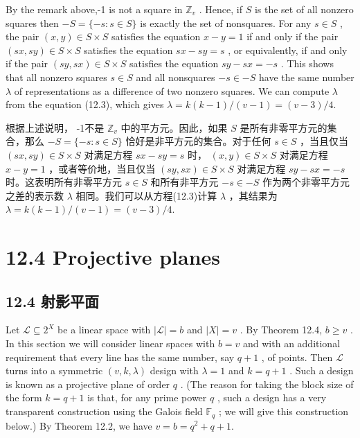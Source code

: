 \documentclass[10pt]{article}
\begin{document}
By the remark above,-1 is not a square in \({\mathbb{Z}}_{v}\) . Hence, if \(S\) is the set of all nonzero squares then \(- S = \{  - s : s \in  S\}\) is exactly the set of nonsquares. For any \(s \in  S\) , the pair \(\left( {x,y}\right)  \in  S \times  S\) satisfies the equation \(x - y = 1\) if and only if the pair \(\left( {{sx},{sy}}\right)  \in  S \times  S\) satisfies the equation \({sx} - {sy} = s\) , or equivalently, if and only if the pair \(\left( {{sy},{sx}}\right)  \in  S \times  S\) satisfies the equation \({sy} - {sx} =  - s\) . This shows that all nonzero squares \(s \in  S\) and all nonsquares \(- s \in   - S\) have the same number \(\lambda\) of representations as a difference of two nonzero squares. We can compute \(\lambda\) from the equation (12.3), which gives \(\lambda  = k\left( {k - 1}\right) /\left( {v - 1}\right)  = \left( {v - 3}\right) /4.\)

\begin{tcolorbox}\relax
根据上述说明， -1不是 \({\mathbb{Z}}_{v}\) 中的平方元。因此，如果 \(S\) 是所有非零平方元的集合，那么 \(- S = \{  - s : s \in  S\}\) 恰好是非平方元的集合。对于任何 \(s \in  S\) ，当且仅当 \(\left( {{sx},{sy}}\right)  \in  S \times  S\) 对满足方程 \({sx} - {sy} = s\) 时， \(\left( {x,y}\right)  \in  S \times  S\) 对满足方程 \(x - y = 1\) ，或者等价地，当且仅当 \(\left( {{sy},{sx}}\right)  \in  S \times  S\) 对满足方程 \({sy} - {sx} =  - s\) 时。这表明所有非零平方元 \(s \in  S\) 和所有非平方元 \(- s \in   - S\) 作为两个非零平方元之差的表示数 \(\lambda\) 相同。我们可以从方程(12.3)计算 \(\lambda\) ，其结果为 \(\lambda  = k\left( {k - 1}\right) /\left( {v - 1}\right)  = \left( {v - 3}\right) /4.\)
\end{tcolorbox}

\section*{12.4 Projective planes}

\begin{tcolorbox}\relax
\section*{12.4 射影平面}
\end{tcolorbox}

Let \(\mathcal{L} \subseteq  {2}^{X}\) be a linear space with \(\left| \mathcal{L}\right|  = b\) and \(\left| X\right|  = v\) . By Theorem 12.4, \(b \geq  v\) . In this section we will consider linear spaces with \(b = v\) and with an additional requirement that every line has the same number, say \(q + 1\) , of points. Then \(\mathcal{L}\) turns into a symmetric \(\left( {v,k,\lambda }\right)\) design with \(\lambda  = 1\) and \(k = q + 1\) . Such a design is known as a projective plane of order \(q\) . (The reason for taking the block size of the form \(k = q + 1\) is that, for any prime power \(q\) , such a design has a very transparent construction using the Galois field \({\mathbb{F}}_{q}\) ; we will give this construction below.) By Theorem 12.2, we have \(v = b = {q}^{2} + q + 1.\)
\end{document}
